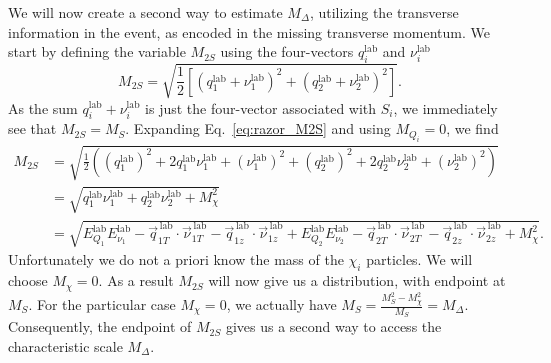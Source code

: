 We will now create a second way to estimate $M_\Delta$, utilizing the transverse information in the
event, as encoded in the missing transverse momentum. We start by defining the variable $M_{2S}$
using the four-vectors $q_i^{\textrm{lab}}$ and $\nu_i^{\textrm{lab}}$
\begin{equation}
  M_{2S} = \sqrt{\frac{1}{2} \left[  (q_1^{\textrm{lab}} + \nu_1^{\textrm{lab}})^2 +
(q_2^{\textrm{lab}} + \nu_2^{\textrm{lab}})^2 \right] } . \label{eq:razor_M2S}
\end{equation}
As the sum $q_i^{\textrm{lab}} + \nu_i^{\textrm{lab}}$ is just the four-vector associated with
$S_i$, we immediately see that $M_{2S} = M_S$. Expanding Eq.~\ref{eq:razor_M2S} and using $M_{Q_i}
= 0$, we find
\begin{align}
  M_{2S} &= \sqrt{\frac{1}{2} \left( (q_1^{\textrm{lab}})^2 + 2 q_1^{\textrm{lab}}
\nu_1^{\textrm{lab}} + (\nu_1^{\textrm{lab}})^2 + (q_2^{\textrm{lab}})^2 + 2 q_2^{\textrm{lab}}
\nu_2^{\textrm{lab}} + (\nu_2^{\textrm{lab}})^2\right) } \\
         &= \sqrt{ q_1^{\textrm{lab}}\nu_1^{\textrm{lab}} + q_2^{\textrm{lab}}\nu_2^{\textrm{lab}}
+ M_\chi^2} \\
         &= \sqrt{ E^{\textrm{lab}}_{Q_1} E^{\textrm{lab}}_{\nu_1} - \vec{q}^{\,\textrm{lab}}_{1T}
\cdot \vec{\nu}^{\,\textrm{lab}}_{1T} - \vec{q}^{\,\textrm{lab}}_{1z} \cdot
\vec{\nu}^{\,\textrm{lab}}_{1z}
                  + E^{\textrm{lab}}_{Q_2} E^{\textrm{lab}}_{\nu_2} - \vec{q}^{\,\textrm{lab}}_{2T}
\cdot \vec{\nu}^{\,\textrm{lab}}_{2T} - \vec{q}^{\,\textrm{lab}}_{2z} \cdot
\vec{\nu}^{\,\textrm{lab}}_{2z} + M_\chi^2} .
\end{align}
Unfortunately we do not a priori know the mass of the $\chi_i$ particles. We will choose $M_\chi =
0$. As a result $M_{2S}$ will now give us a distribution, with endpoint at $M_S$. For the
particular case $M_\chi = 0$, we actually have $M_S = \frac{M_S^2-M_\chi^2}{M_S} = M_\Delta$.
Consequently, the endpoint of $M_{2S}$ gives us a second way to access the characteristic scale
$M_\Delta$.


